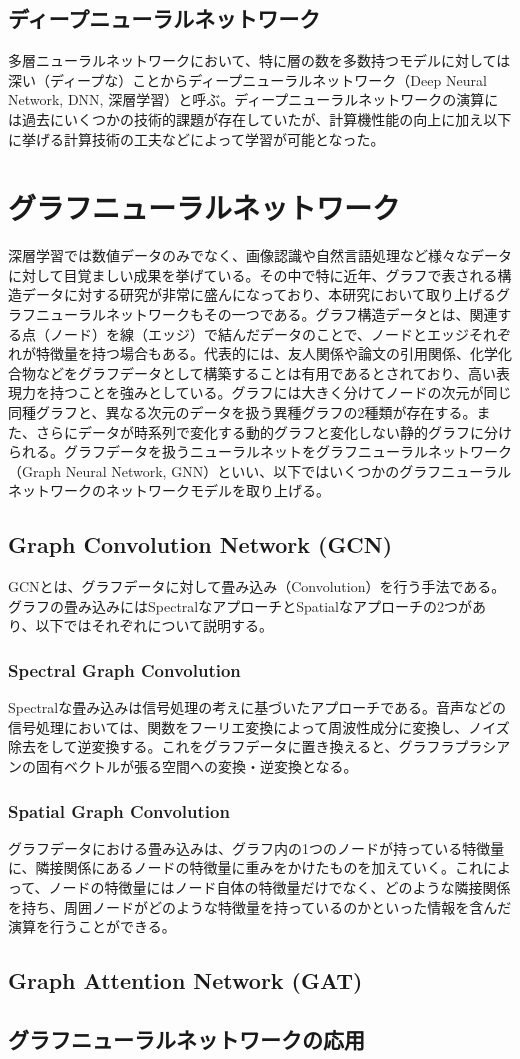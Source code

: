 \subsection{ディープニューラルネットワーク}
多層ニューラルネットワークにおいて、特に層の数を多数持つモデルに対しては深い（ディープな）ことからディープニューラルネットワーク（Deep Neural Network, DNN, 深層学習）と呼ぶ。ディープニューラルネットワークの演算には過去にいくつかの技術的課題が存在していたが、計算機性能の向上に加え以下に挙げる計算技術の工夫などによって学習が可能となった。
\section{グラフニューラルネットワーク}
深層学習では数値データのみでなく、画像認識や自然言語処理など様々なデータに対して目覚ましい成果を挙げている。その中で特に近年、グラフで表される構造データに対する研究が非常に盛んになっており、本研究において取り上げるグラフニューラルネットワークもその一つである。グラフ構造データとは、関連する点（ノード）を線（エッジ）で結んだデータのことで、ノードとエッジそれぞれが特徴量を持つ場合もある。代表的には、友人関係や論文の引用関係、化学化合物などをグラフデータとして構築することは有用であるとされており、高い表現力を持つことを強みとしている。グラフには大きく分けてノードの次元が同じ同種グラフと、異なる次元のデータを扱う異種グラフの2種類が存在する。また、さらにデータが時系列で変化する動的グラフと変化しない静的グラフに分けられる。グラフデータを扱うニューラルネットをグラフニューラルネットワーク（Graph Neural Network, GNN）といい、以下ではいくつかのグラフニューラルネットワークのネットワークモデルを取り上げる。
\subsection{Graph Convolution Network (GCN)}
GCNとは、グラフデータに対して畳み込み（Convolution）を行う手法である。グラフの畳み込みにはSpectralなアプローチとSpatialなアプローチの2つがあり、以下ではそれぞれについて説明する。
\subsubsection{Spectral Graph Convolution}
Spectralな畳み込みは信号処理の考えに基づいたアプローチである。音声などの信号処理においては、関数をフーリエ変換によって周波性成分に変換し、ノイズ除去をして逆変換する。これをグラフデータに置き換えると、グラフラプラシアンの固有ベクトルが張る空間への変換・逆変換となる。
\subsubsection{Spatial Graph Convolution}
グラフデータにおける畳み込みは、グラフ内の1つのノードが持っている特徴量に、隣接関係にあるノードの特徴量に重みをかけたものを加えていく。これによって、ノードの特徴量にはノード自体の特徴量だけでなく、どのような隣接関係を持ち、周囲ノードがどのような特徴量を持っているのかといった情報を含んだ演算を行うことができる。
\subsection{Graph Attention Network (GAT)}

\subsection{グラフニューラルネットワークの応用}